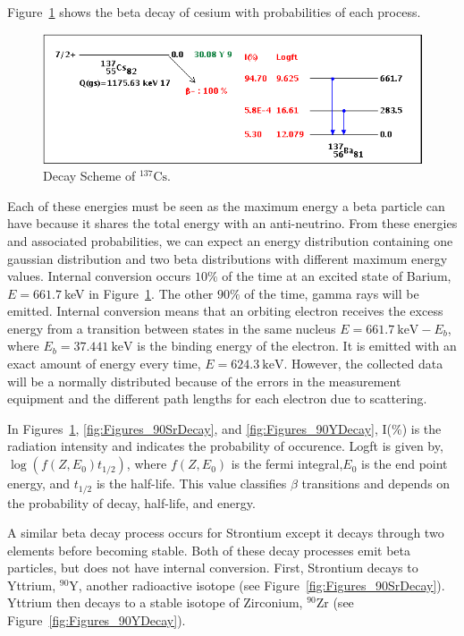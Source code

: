 Figure~\ref{fig:Figures_137CsDecayScheme} shows the beta decay of cesium with probabilities of each process.
\begin{figure}
	[tbp] \centering 
	\includegraphics[width=.9
	\textwidth]{./Figures/137CsDecayScheme.png} \caption{Decay Scheme of $^{137}\textrm{Cs}$.\cite{nndc}} \label{fig:Figures_137CsDecayScheme} 
\end{figure}%
Each of these energies must be seen as the maximum energy a beta particle can have because it shares the total energy with an anti-neutrino. From these energies and associated probabilities, we can expect an energy distribution containing one gaussian distribution and two beta distributions with different maximum energy values. Internal conversion occurs $10\%$ of the time at an excited state of Barium, $E=661.7~$keV in Figure~\ref{fig:Figures_137CsDecayScheme}. The other $90\%$ of the time, gamma rays will be emitted. Internal conversion means that an orbiting electron receives the excess energy from a transition between states in the same nucleus $E=661.7~\text{keV}-E_b$, where $E_b=37.441~\text{keV}$ is the binding energy of the electron. It is emitted with an exact amount of energy every time, $E=624.3~\text{keV}$.  However, the collected data will be a normally distributed because of the errors in the measurement equipment and the different path lengths for each electron due to scattering.  

In Figures~\ref{fig:Figures_137CsDecayScheme}, \ref{fig:Figures_90SrDecay}, and \ref{fig:Figures_90YDecay}, I(\%) is the radiation intensity and indicates the probability of occurence.  Logft is given by, $\log(f(Z,E_0)t_{1/2})$, where $f(Z,E_0)$ is the fermi integral,$E_0$ is the end point energy, and $t_{1/2}$ is the half-life.  This value classifies $\beta$ transitions and depends on the probability of decay, half-life, and energy.\cite{nndc} 

A similar beta decay process occurs for Strontium except it decays through two elements before becoming stable. Both of these decay processes emit beta particles, but does not have internal conversion. First, Strontium decays to Yttrium, $^{90}\text{Y}$, another radioactive isotope (see Figure~\ref{fig:Figures_90SrDecay}). Yttrium then decays to a stable isotope of Zirconium, $^{90}\text{Zr}$ (see Figure~\ref{fig:Figures_90YDecay}).

